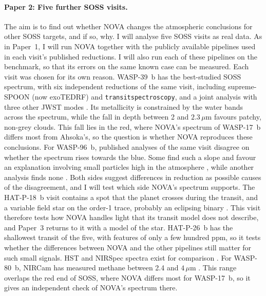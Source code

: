 \paragraph{Paper 2: Five further SOSS visits.} The aim is to find out whether
NOVA changes the atmospheric conclusions for other SOSS targets, and if so,
why. I will analyse five SOSS visits as real data. As in Paper~1, I will run
NOVA together with the publicly available pipelines used in each visit's
published reductions. I will also run each of these pipelines on the benchmark, so that its errors on the same known case can be measured. Each visit was chosen for its own reason. WASP-39~b has
the best-studied SOSS spectrum, with six independent reductions of the same
visit, including supreme-SPOON (now exoTEDRF) and \texttt{transitspectroscopy},
and a joint analysis with three other JWST modes
\citep{FeinsteinEtAl2023,CarterEtAl2024}. Its metallicity is constrained by the water bands across the spectrum, while the fall in depth between 2 and $2.3\,\mu\mathrm{m}$ favours patchy, non-grey clouds. This fall lies in the red, where NOVA's spectrum of WASP-17~b differs most from Ahsoka's, so the question is whether NOVA reproduces these conclusions. For WASP-96~b, published
analyses of the same visit disagree on whether the spectrum rises towards the
blue. Some find such a slope \citep{RadicaEtAl2023,TaylorEtAl2023,RadicaEtAl2026}
and favour an explanation involving small particles high in the atmosphere
\citep{TaylorEtAl2023,RadicaEtAl2026}, while another analysis finds none
\citep{WangEtAl2026}. Both sides suggest differences in reduction as possible causes of the disagreement, and I will test which side NOVA's spectrum supports.
The HAT-P-18~b visit contains a spot that the planet crosses during the
transit, and a variable field star on the order-1 trace, probably an
eclipsing binary \citep{FuEtAl2022}. This visit therefore tests how NOVA handles light
that its transit model does not describe, and Paper~3 returns to it
with a model of the star. HAT-P-26~b has the shallowest transit of the five,
with features of only a few hundred ppm, so it tests whether the differences between NOVA and the other pipelines
still matter for such small signals. HST and NIRSpec spectra exist
for comparison \citep{WakefordEtAl2017,GressierEtAl2025}. For WASP-80~b, NIRCam
has measured methane between 2.4 and $4\,\mu\mathrm{m}$ \citep{BellEtAl2023}.
This range overlaps the red end of SOSS, where NOVA differs most for
WASP-17~b, so it gives an independent check of NOVA's spectrum there. 

